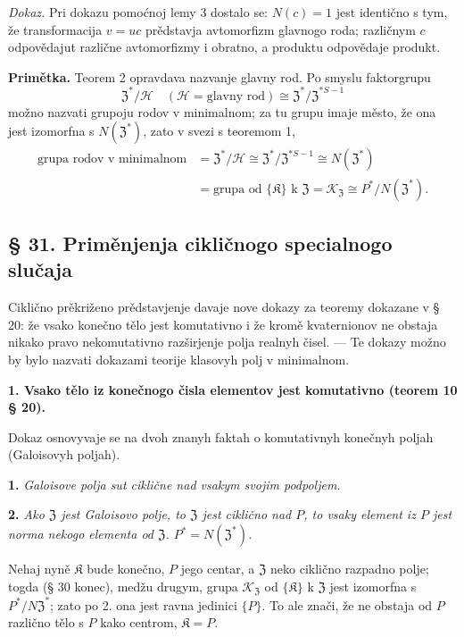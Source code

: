 \documentclass[11pt]{article}
\begin{document}
\noindent\emph{Dokaz.} Pri dokazu pomoćnoj lemy 3 dostalo se: \(N(c)=1\) jest identično s tym, že transformacija \(v=uc\) prědstavja avtomorfizm glavnogo roda; različnym \(c\) odpovědajut različne avtomorfizmy i obratno, a produktu odpovědaje produkt.

\noindent\textbf{Primětka.} Teorem 2 opravdava nazvanje glavny rod. Po smyslu faktorgrupu
\[
\mathfrak Z^*/\mathscr H
\quad(\mathscr H=\text{glavny rod})
\cong\mathfrak Z^*/\mathfrak Z^{*S-1}
\]
možno nazvati grupoju rodov v minimalnom; za tu grupu imaje město, že ona jest izomorfna s \(N(\mathfrak Z^*)\), zato v svezi s teoremom 1,
\[
\begin{aligned}
\text{grupa rodov v minimalnom}
&=\mathfrak Z^*/\mathscr H
 \cong\mathfrak Z^*/\mathfrak Z^{*S-1}
 \cong N(\mathfrak Z^*)\\
&=\text{grupa od }\{\mathfrak K\}\text{ k }\mathfrak Z
 =\mathscr K_{\mathfrak Z}
 \cong P^*/N(\mathfrak Z^*).
\end{aligned}
\]

\subsection*{§ 31. Priměnjenja cikličnogo specialnogo slučaja}\label{anwendungen-des-zyklischen-spezialfalles}

Ciklično prěkriženo prědstavjenje davaje nove dokazy za teoremy dokazane v § 20: že vsako konečno tělo jest komutativno i že kromě kvaternionov ne obstaja nikako pravo nekomutativno razširjenje polja realnyh čisel. --- Te dokazy možno by bylo nazvati dokazami teorije klasovyh polj v minimalnom.

\noindent\textbf{1. Vsako tělo iz konečnogo čisla elementov jest komutativno (teorem 10 § 20).}

Dokaz osnovyvaje se na dvoh znanyh faktah o komutativnyh konečnyh poljah (Galoisovyh poljah).

\noindent\textbf{1.} \emph{Galoisove polja sut ciklične nad vsakym svojim podpoljem.}

\noindent\textbf{2.} \emph{Ako \(\mathfrak Z\) jest Galoisovo polje, to \(\mathfrak Z\) jest ciklično nad \(P\), to vsaky element iz \(P\) jest norma nekogo elementa od \(\mathfrak Z\). \(P^*=N(\mathfrak Z^*)\).}

Nehaj nyně \(\mathfrak K\) bude konečno, \(P\) jego centar, a \(\mathfrak Z\) neko ciklično razpadno polje; togda (§ 30 konec), medžu drugym, grupa \(\mathscr K_{\mathfrak Z}\) od \(\{\mathfrak K\}\) k \(\mathfrak Z\) jest izomorfna s \(P^*/N\mathfrak Z^*\); zato po 2. ona jest ravna jedinici \(\{P\}\). To ale znači, že ne obstaja od \(P\) različno tělo s \(P\) kako centrom, \(\mathfrak K=P\).
\end{document}

